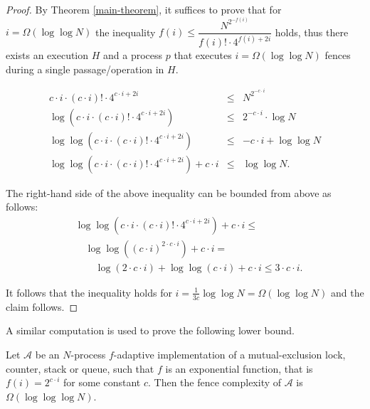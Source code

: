 \begin{proof}
	By Theorem \ref{main-theorem}, it suffices to prove that for $i = \Omega(\log \log N)$ the inequality $f(i) \leq \dfrac{N^{2^{-f(i)}}} {f(i)! \cdot 4^{f(i)+2i}}$ holds, thus there exists an execution $H$ and a process $p$ that executes $i = \Omega(\log \log N)$ fences during a single passage/operation in $H$.
	
	\begin{equation*}
		\begin{array}{rcl}
			c \cdot i \cdot (c \cdot i)! \cdot 4^{c \cdot i +2i} & \leq & {N^{2^{-c \cdot i}}} \\
			\log(c \cdot i \cdot (c \cdot i)! \cdot 4^{c \cdot i +2i}) & \leq & 2^{-c \cdot i}\cdot \log N \\
			\log \log(c \cdot i \cdot (c \cdot i)! \cdot 4^{c \cdot i +2i}) & \leq & -c \cdot i + \log \log N \\
			\log \log(c \cdot i \cdot (c \cdot i)! \cdot 4^{c \cdot i +2i}) + c \cdot i & \leq & \log \log N.
		\end{array}
	\end{equation*}
	
The right-hand side of the above inequality can be bounded from above as follows:
\begin{align*}
	& \log \log(c \cdot i \cdot (c \cdot i)! \cdot 4^{c \cdot i +2i}) + c \cdot i \leq \\
	& \quad \log \log((c \cdot i)^{2 \cdot c \cdot i}) + c \cdot i = \\
	& \qquad \log (2 \cdot c \cdot i) + \log \log(c \cdot i) + c \cdot i \leq 3 \cdot c \cdot i.
\end{align*}

	It follows that the inequality holds for $i = \frac{1}{3c}\log \log N = \Omega(\log \log N)$ and the claim follows.
\end{proof}

A similar computation is used to prove the following lower bound.

\begin{corollary}
\label{corollary-exp}
Let $\mathcal{A}$ be an  $N$-process $f$-adaptive implementation of a mutual-exclusion lock, counter, stack or queue, such that $f$ is an exponential function, that is $f(i) = 2^{c \cdot i}$ for some constant $c$. Then the fence complexity of $\mathcal{A}$ is $\Omega (\log \log \log N)$.
\end{corollary}

